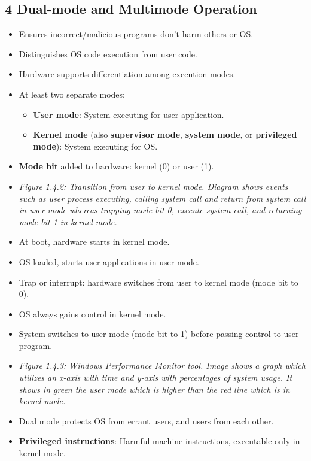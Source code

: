 \documentclass{article}
\begin{document}
\subsection*{4 Dual-mode and Multimode Operation}
\begin{itemize}
    \item Ensures incorrect/malicious programs don't harm others or OS.
    \item Distinguishes OS code execution from user code.
    \item Hardware supports differentiation among execution modes.
    \item At least two separate modes:
    \begin{itemize}
        \item \textbf{User mode}: System executing for user application.
        \item \textbf{Kernel mode} (also \textbf{supervisor mode}, \textbf{system mode}, or \textbf{privileged mode}): System executing for OS.
    \end{itemize}
    \item \textbf{Mode bit} added to hardware: kernel (0) or user (1).
    \item \textit{Figure 1.4.2: Transition from user to kernel mode. Diagram shows events such as user process executing, calling system call and return from system call in user mode whereas trapping mode bit 0, execute system call, and returning mode bit 1 in kernel mode.}
    \item At boot, hardware starts in kernel mode.
    \item OS loaded, starts user applications in user mode.
    \item Trap or interrupt: hardware switches from user to kernel mode (mode bit to 0).
    \item OS always gains control in kernel mode.
    \item System switches to user mode (mode bit to 1) before passing control to user program.
    \item \textit{Figure 1.4.3: Windows Performance Monitor tool. Image shows a graph which utilizes an x-axis with time and y-axis with percentages of system usage. It shows in green the user mode which is higher than the red line which is in kernel mode.}
    \item Dual mode protects OS from errant users, and users from each other.
    \item \textbf{Privileged instructions}: Harmful machine instructions, executable only in kernel mode.

\end{itemize}
\end{document}
